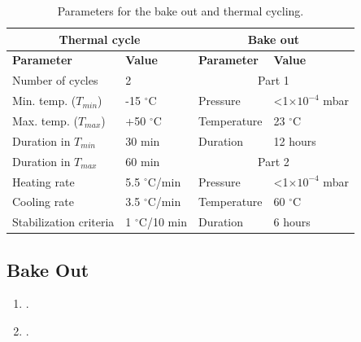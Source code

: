 \begin{table}[!h]
    \begin{center}
        \begin{tabular}{llll}
            \toprule[1.5pt]
            \multicolumn{2}{c}{\textbf{Thermal cycle}}  & \multicolumn{2}{c}{\textbf{Bake out}}        \\
            \midrule
            \textbf{Parameter}     & \textbf{Value}     & \textbf{Parameter} & \textbf{Value}          \\
            \midrule
            Number of cycles       & 2                  & \multicolumn{2}{c}{Part 1}                   \\
            \cmidrule{3-4}
            Min. temp. ($T_{min}$) & -15 $^\circ$C      & Pressure           & <1$\times 10^{-4}$ mbar \\
            Max. temp. ($T_{max}$) & +50 $^\circ$C      & Temperature        & 23 $^\circ$C            \\
            Duration in $T_{min}$  & 30 min             & Duration           & 12 hours                \\
            \cmidrule{3-4}
            Duration in $T_{max}$  & 60 min             & \multicolumn{2}{c}{Part 2}                   \\
            \cmidrule{3-4}
            Heating rate           & 5.5 $^\circ$C/min  & Pressure           & <1$\times 10^{-4}$ mbar \\
            Cooling rate           & 3.5 $^\circ$C/min  & Temperature        & 60 $^\circ$C            \\
            Stabilization criteria & 1 $^\circ$C/10 min & Duration           & 6 hours                 \\
            \bottomrule[1.5pt]
        \end{tabular}
        \caption{Parameters for the bake out and thermal cycling.}
        \label{tab:fsat-thermal-cycling}
    \end{center}
\end{table}

\subsection{Bake Out}

\begin{enumerate}
    \item .
    \item .
\end{enumerate}

